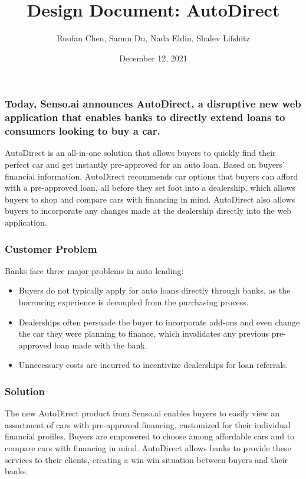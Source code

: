 \documentclass[fontsize=14pt]{article}
\title{\vspace{-2.5cm} \textbf{Design Document: AutoDirect} \vspace{-0.25cm}}
\author{Ruofan Chen, Samm Du, Nada Eldin, Shalev Lifshitz}
\date{\vspace{-0.25cm} December 12, 2021 \vspace{-0.5cm}}
\begin{document}
\large

\maketitle

\subsubsection*{\large Today, Senso.ai announces AutoDirect, a disruptive new web application that enables banks to directly extend loans to consumers looking to buy a car.}

AutoDirect is an all-in-one solution that allows buyers to quickly find their perfect car and get instantly pre-approved for an auto loan. Based on buyers' financial information, AutoDirect recommends car options that buyers can afford with a pre-approved loan, all before they set foot into a dealership, which allows buyers to shop and compare cars with financing in mind. AutoDirect also allows buyers to incorporate any changes made at the dealership directly into the web application.

\subsubsection*{\large Customer Problem}

Banks face three major problems in auto lending:
\begin{itemize}
    \setlength\itemsep{0em}
    \item Buyers do not typically apply for auto loans directly through banks, as the borrowing experience is decoupled from the purchasing process. 
    
    \item Dealerships often persuade the buyer to incorporate add-ons and even change the car they were planning to finance, which invalidates any previous pre-approved loan made with the bank.
    
    \item Unnecessary costs are incurred to incentivize dealerships for loan referrals.
\end{itemize}

\subsubsection*{\large Solution}

The new AutoDirect product from Senso.ai enables buyers to easily view an assortment of cars with pre-approved financing, customized for their individual financial profiles. Buyers are empowered to choose among affordable cars and to compare cars with financing in mind. AutoDirect allows banks to provide these services to their clients, creating a win-win situation between buyers and their banks.
\end{document}
